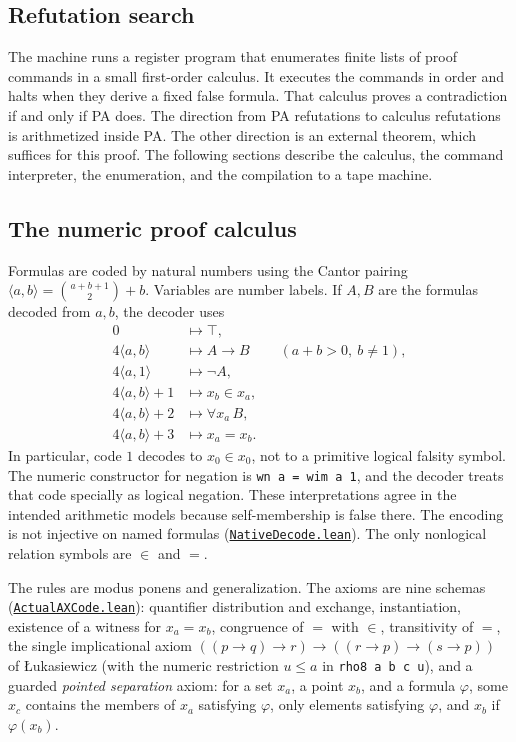 \documentclass[11pt,letterpaper]{article}
\newcommand{\src}[2]{\href{https://github.com/jamesyc/BusyBeaver/blob/main/#1}{\texttt{\nolinkurl{#2}}}}
\begin{document}
\subsection{Refutation search}

The machine runs a register program that enumerates finite lists of proof
commands in a small first-order calculus. It executes the commands in
order and halts when they derive a fixed false formula. That calculus
proves a contradiction if and only if PA does. The direction from PA
refutations to calculus refutations is arithmetized inside PA. The other
direction is an external theorem, which suffices for this proof. The
following sections describe the calculus, the command interpreter, the
enumeration, and the compilation to a tape machine.

\subsection{The numeric proof calculus}

Formulas are coded by natural numbers using the Cantor pairing
$\langle a,b\rangle=\binom{a+b+1}{2}+b$. Variables are number labels.
If $A,B$ are the formulas decoded from $a,b$, the decoder uses
\[
\begin{aligned}
0 &\mapsto \top,\\
4\langle a,b\rangle &\mapsto A\to B &&(a+b>0,\ b\ne1),\\
4\langle a,1\rangle &\mapsto \neg A,\\
4\langle a,b\rangle+1 &\mapsto x_b\in x_a,\\
4\langle a,b\rangle+2 &\mapsto \forall x_a\,B,\\
4\langle a,b\rangle+3 &\mapsto x_a=x_b.
\end{aligned}
\]
In particular, code $1$ decodes to $x_0\in x_0$, not to a primitive
logical falsity symbol. The numeric constructor for negation is
\texttt{wn a = wim a 1}, and the decoder treats that code specially as
logical negation. These interpretations agree in the intended arithmetic
models because self-membership is false there. The encoding is not
injective on named formulas
(\src{Lean/metamathematics/PA215PA/NativeDecode.lean}{NativeDecode.lean}).
The only nonlogical relation symbols are $\in$ and $=$.

The rules are modus ponens and generalization. The axioms are nine
schemas (\src{Lean/PA215/Source/ActualAXCode.lean}{ActualAXCode.lean}):
quantifier distribution and exchange, instantiation, existence of a
witness for $x_a=x_b$, congruence of $=$ with $\in$, transitivity of $=$,
the single implicational axiom
$((p\to q)\to r)\to((r\to p)\to(s\to p))$ of {\L}ukasiewicz (with the
numeric restriction $u\le a$ in \texttt{rho8 a b c u}), and a guarded
\emph{pointed separation} axiom: for a
set $x_a$, a point $x_b$, and a formula $\varphi$, some $x_c$ contains the
members of $x_a$ satisfying $\varphi$, only elements satisfying $\varphi$,
and $x_b$ if $\varphi(x_b)$.
\end{document}

